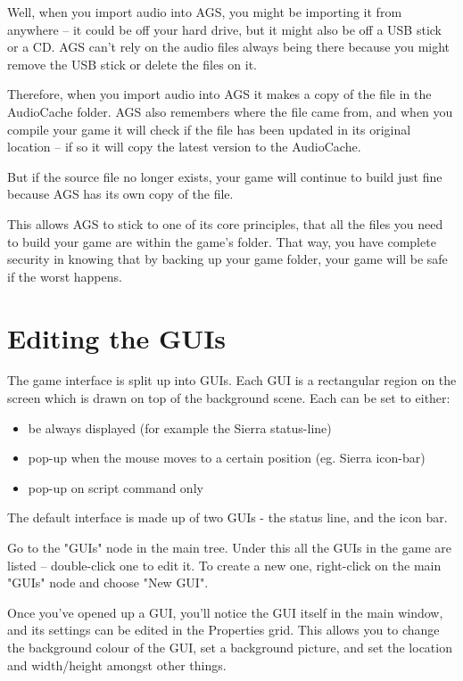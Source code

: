 Well, when you import audio into AGS, you might be importing it from anywhere --
it could be off your hard drive, but it might also be off a USB stick or a CD.
AGS can't rely on the audio files always being there because you might remove
the USB stick or delete the files on it.

Therefore, when you import audio into AGS it makes a copy of the file in the AudioCache
folder. AGS also remembers where the file came from, and when you compile your game
it will check if the file has been updated in its original location -- if so it will
copy the latest version to the AudioCache.

But if the source file no longer exists, your game will continue to build just fine
because AGS has its own copy of the file.

This allows AGS to stick to one of its core principles, that all the files you need
to build your game are within the game's folder. That way, you have complete security
in knowing that by backing up your game folder, your game will be safe if the worst happens.


\section{Editing the GUIs}%

The game interface is split up into GUIs. Each GUI is a
rectangular region on the screen which is drawn on top of the background
scene. Each can be set to either:
\begin{itemize}
\item be always displayed (for example the Sierra status-line)
\item pop-up when the mouse moves to a certain position (eg. Sierra icon-bar)
\item pop-up on script command only
\end{itemize}
The default interface is made up of two GUIs - the status line, and the
icon bar.

Go to the "GUIs" node in the main tree. Under this all the GUIs in the game
are listed -- double-click one to edit it. To create a new one, right-click
on the main "GUIs" node and choose "New GUI".

Once you've opened up a GUI, you'll notice the GUI itself in the main window,
and its settings can be edited in the Properties grid. This allows you to change the
background colour of the GUI, set a background picture, and set the
location and width/height amongst other things.

